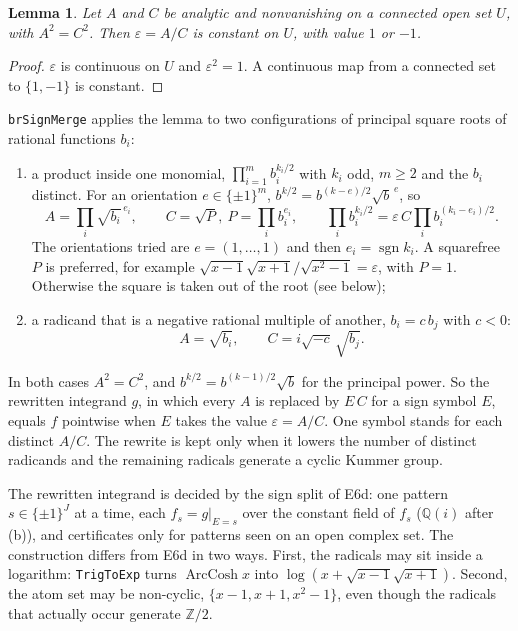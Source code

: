 \documentclass[11pt]{article}
\newtheorem{lemma}[theorem]{Lemma}
\theoremstyle{definition}
\theoremstyle{remark}
\newcommand{\Q}{\mathbb{Q}}
\newcommand{\Z}{\mathbb{Z}}
\newcommand{\code}[1]{\texttt{#1}}
\begin{document}
\begin{lemma}\label{lem:E6d1}
Let $A$ and $C$ be analytic and nonvanishing on a connected open set $U$, with
$A^2=C^2$. Then $\varepsilon=A/C$ is constant on $U$, with value $1$ or $-1$.
\end{lemma}

\begin{proof}
$\varepsilon$ is continuous on $U$ and $\varepsilon^2=1$. A continuous map from
a connected set to $\{1,-1\}$ is constant.
\end{proof}

\code{brSignMerge} applies the lemma to two configurations of principal square
roots of rational functions $b_i$:
\begin{enumerate}
\item[(a)] a product inside one monomial,
  $\prod_{i=1}^m b_i^{k_i/2}$ with $k_i$ odd, $m\ge2$ and the $b_i$ distinct.
  For an orientation $e\in\{\pm1\}^m$, $b^{k/2}=b^{(k-e)/2}\sqrt b^{\,e}$, so
  \[ A=\prod_i\sqrt{b_i}^{\,e_i},\qquad C=\sqrt{P},\ P=\prod_ib_i^{e_i},\qquad
     \prod_ib_i^{k_i/2}=\varepsilon\,C\prod_ib_i^{(k_i-e_i)/2}. \]
  The orientations tried are $e=(1,\dots,1)$ and then $e_i=\operatorname{sgn}k_i$.
  A squarefree $P$ is preferred, for example
  $\sqrt{x-1}\sqrt{x+1}/\sqrt{x^2-1}=\varepsilon$, with $P=1$. Otherwise the
  square is taken out of the root (see below);
\item[(b)] a radicand that is a negative rational multiple of another,
  $b_i=c\,b_j$ with $c<0$:
  \[ A=\sqrt{b_i},\qquad C=i\sqrt{-c}\,\sqrt{b_j}. \]
\end{enumerate}
In both cases $A^2=C^2$, and $b^{k/2}=b^{(k-1)/2}\sqrt b$ for the principal
power. So the rewritten integrand $g$, in which every $A$ is replaced by
$E\,C$ for a sign symbol $E$, equals $f$ pointwise when $E$ takes the value
$\varepsilon=A/C$. One symbol stands for each distinct $A/C$. The rewrite is
kept only when it lowers the number of distinct radicands and the remaining
radicals generate a cyclic Kummer group.

The rewritten integrand is decided by the sign split of E6d: one pattern
$s\in\{\pm1\}^J$ at a time, each $f_s=g|_{E=s}$ over the constant field of
$f_s$ ($\Q(i)$ after (b)), and certificates only for patterns seen on an open
complex set. The construction differs from E6d in two ways. First, the
radicals may sit inside a logarithm: \code{TrigToExp} turns $\operatorname{ArcCosh}x$
into $\log(x+\sqrt{x-1}\sqrt{x+1})$. Second, the atom set may be non-cyclic,
$\{x-1,x+1,x^2-1\}$, even though the radicals that actually occur generate
$\Z/2$.
\end{document}
